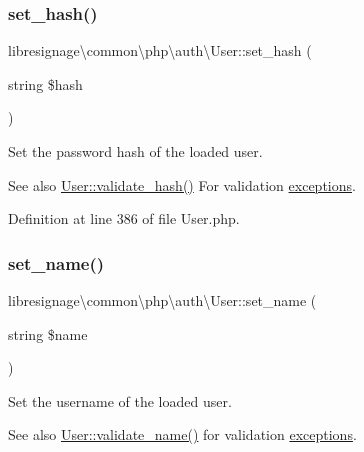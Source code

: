 \subsubsection{\texorpdfstring{set\+\_\+hash()}{set\_hash()}}
{\footnotesize\ttfamily libresignage\textbackslash{}common\textbackslash{}php\textbackslash{}auth\textbackslash{}\+User\+::set\+\_\+hash (\begin{DoxyParamCaption}\item[{string}]{\$hash }\end{DoxyParamCaption})}

Set the password hash of the loaded user.

\begin{DoxySeeAlso}{See also}
\hyperlink{classlibresignage_1_1common_1_1php_1_1auth_1_1User_aa7f7b7f85ff1e6b115dbff844bde4d30}{User\+::validate\+\_\+hash()} For validation \hyperlink{namespacelibresignage_1_1common_1_1php_1_1auth_1_1exceptions}{exceptions}. 
\end{DoxySeeAlso}


Definition at line 386 of file User.\+php.

\mbox{\label{classlibresignage_1_1common_1_1php_1_1auth_1_1User_a51df58a997c3011452f357f7c98fca36}} 
\subsubsection{\texorpdfstring{set\+\_\+name()}{set\_name()}}
{\footnotesize\ttfamily libresignage\textbackslash{}common\textbackslash{}php\textbackslash{}auth\textbackslash{}\+User\+::set\+\_\+name (\begin{DoxyParamCaption}\item[{string}]{\$name }\end{DoxyParamCaption})}

Set the username of the loaded user.

\begin{DoxySeeAlso}{See also}
\hyperlink{classlibresignage_1_1common_1_1php_1_1auth_1_1User_aaa1e2c403cf7dedd68c2e832719bc852}{User\+::validate\+\_\+name()} for validation \hyperlink{namespacelibresignage_1_1common_1_1php_1_1auth_1_1exceptions}{exceptions}.
\end{DoxySeeAlso}

